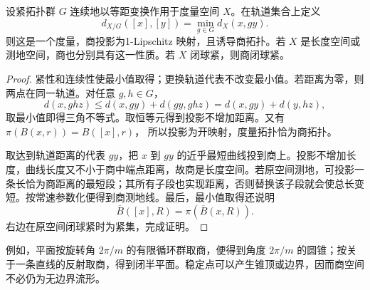 \begin{proposition}\label{g3:prop:compact-group-metric-quotient}
	设紧拓扑群 \(G\) 连续地以等距变换作用于度量空间 \(X\)。在轨道集合上定义
	\[
		d_{X/G}([x],[y])=\min_{g\in G}d_X(x,gy).
	\]
	则这是一个度量，商投影为1-Lipschitz 映射，且诱导商拓扑。若 \(X\) 是长度空间或测地空间，商也分别具有这一性质。若 \(X\) 闭球紧，则商闭球紧。
\end{proposition}
\begin{proof}
	紧性和连续性使最小值取得；更换轨道代表不改变最小值。若距离为零，则两点在同一轨道。对任意 \(g,h\in G\)，
	\[
		d(x,ghz)\le d(x,gy)+d(gy,ghz)
		=d(x,gy)+d(y,hz),
	\]
	取最小值即得三角不等式。取恒等元得到投影不增加距离。又有
	\(\pi(B(x,r))=B([x],r)\)，
	所以投影为开映射，度量拓扑恰为商拓扑。

	取达到轨道距离的代表 \(gy\)，把 \(x\) 到 \(gy\) 的近乎最短曲线投到商上。投影不增加长度，曲线长度又不小于商中端点距离，故商是长度空间。若原空间测地，可投影一条长恰为商距离的最短段；其所有子段也实现距离，否则替换该子段就会使总长变短。按常速参数化便得到商测地线。最后，最小值取得还说明
	\[
		\overline B([x],R)=\pi(\overline B(x,R)).
	\]
	右边在原空间闭球紧时为紧集，完成证明。
\end{proof}

例如，平面按旋转角 \(2\pi/m\) 的有限循环群取商，便得到角度 \(2\pi/m\) 的圆锥；按关于一条直线的反射取商，得到闭半平面。稳定点可以产生锥顶或边界，因而商空间不必仍为无边界流形。

